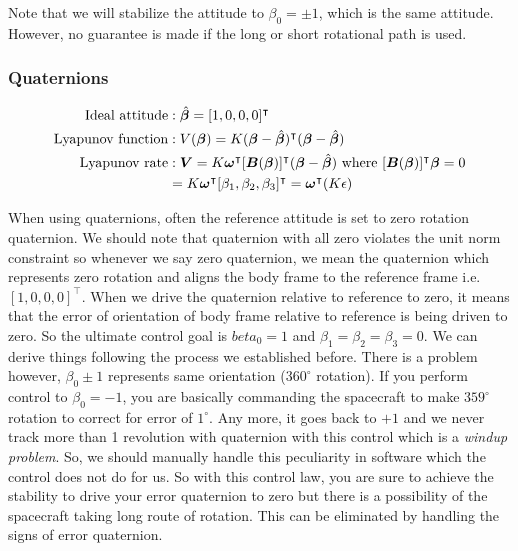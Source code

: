 \documentclass{article}
\begin{document}
Note that we will stabilize the attitude to $\beta_{0}=\pm1$, which is the same attitude. However, no guarantee is made if the long or short rotational path is used.

\subsubsection{Quaternions}
\begin{equation*}
  \begin{split}
    \textnormal{Ideal attitude}&:\hat{\bm{\beta}}=[1,0,0,0]^{\intercal}\\
    \textnormal{Lyapunov function}&:V(\bm{\beta})=K(\bm{\beta}-\hat{\bm{\beta}})^{\intercal}(\bm{\beta}-\hat{\bm{\beta}})\\
    \textnormal{Lyapunov rate}&:\bm{V}=K\bm{\omega}^{\intercal}[\bm{B}({\bm{\beta}})]^{\intercal}(\bm{\beta}-\hat{\bm{\beta}})\textnormal{ where }[\bm{B}({\bm{\beta}})]^{\intercal}\bm{\beta}=0\\
    &= K\bm{\omega}^{\intercal}[\beta_{1},\beta_{2},\beta_{3}]^{\intercal}=\bm{\omega}^{\intercal}(K\epsilon)
  \end{split}
\end{equation*}

When using quaternions, often the reference attitude is set to zero rotation quaternion. We should note that quaternion with all zero violates the unit norm constraint so whenever we say zero quaternion, we mean the quaternion which represents zero rotation and aligns the body frame to the reference frame i.e. $[1,0,0,0]^{\intercal}$. When we drive the quaternion relative to reference to zero, it means that the error of orientation of body frame relative to reference is being driven to zero. So the ultimate control goal is $beta_{0}=1$ and $\beta_{1}=\beta_{2}=\beta_{3}=0$. We can derive things following the process we established before. There is a problem however, $\beta_{0}\pm1$ represents same orientation ($360^\circ$ rotation). If you perform control to $\beta_{0}=-1$, you are basically commanding the spacecraft to make $359^{\circ}$ rotation to correct for error of $1^{\circ}$. Any more, it goes back to $+1$ and we never track more than 1 revolution with quaternion with this control which is a \textit{windup problem}. So, we should manually handle this peculiarity in software which the control does not do for us. So with this control law, you are sure to achieve the stability to drive your error quaternion to zero but there is a possibility of the spacecraft taking long route of rotation. This can be eliminated by handling the signs of error quaternion.
\end{document}
